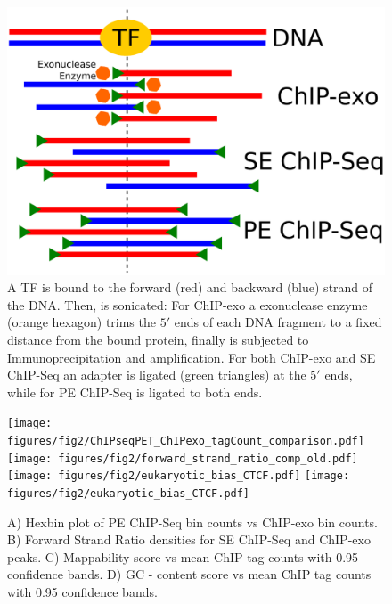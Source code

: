 \documentclass{bmcart}
\begin{document}
\begin{figure}[h!]
  \centering
  \includegraphics[width =
  .95 \textwidth]{figures/fig1/chip_explanation_withEnzyme.pdf}
  \caption{A TF is bound to the forward (red) and backward (blue)
    strand of the DNA. Then, is sonicated: For ChIP-exo a exonuclease
    enzyme (orange hexagon) trims the $5\prime$ ends of each DNA
    fragment to a fixed distance from the bound protein, finally is
    subjected to Immunoprecipitation and amplification. For both
    ChIP-exo and SE ChIP-Seq an adapter is ligated (green triangles)
    at the $5\prime$ ends, while for PE ChIP-Seq is ligated to both
    ends.}
  \label{fig:chip_diagram}
\end{figure}
\newpage

\begin{figure}[h!]
  \centering
  \texttt{[image: figures/fig2/ChIPseqPET\_ChIPexo\_tagCount\_comparison.pdf]}
  \texttt{[image: figures/fig2/forward\_strand\_ratio\_comp\_old.pdf]}
  \texttt{[image: figures/fig2/eukaryotic\_bias\_CTCF.pdf]}
  \texttt{[image: figures/fig2/eukaryotic\_bias\_CTCF.pdf]}
  \caption{ A) Hexbin plot of PE ChIP-Seq bin counts vs ChIP-exo bin
    counts. B) Forward Strand Ratio densities for SE ChIP-Seq and
    ChIP-exo peaks. C) Mappability score vs mean ChIP tag counts with
    0.95 confidence bands. D) GC - content score vs mean ChIP tag
    counts with 0.95 confidence bands.}
  \label{fig:comp}
\end{figure}
\end{document}

